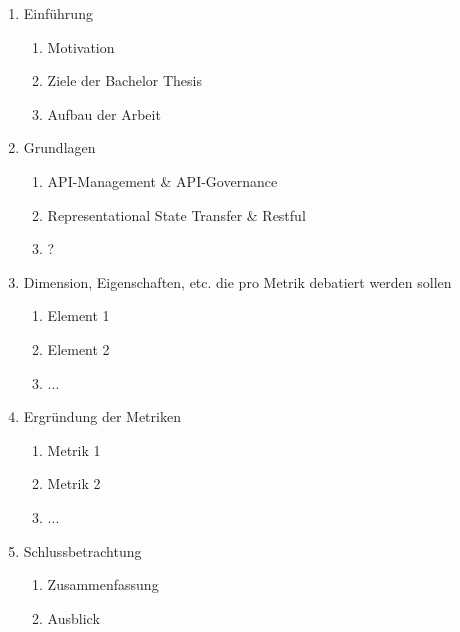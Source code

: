 \documentclass[../../expose]{subfiles}
\begin{document}
\begin{enumerate}[1]
	\item Einführung
		\begin{enumerate}
			\item Motivation
			\item Ziele der Bachelor Thesis
			\item Aufbau der Arbeit
		\end{enumerate}
	\item Grundlagen
		\begin{enumerate}
   			\item API-Management \& API-Governance
   			\item Representational State Transfer \& Restful
   			\item ?
   		\end{enumerate}
	\item Dimension, Eigenschaften, etc. die pro Metrik debatiert werden sollen
    	\begin{enumerate}
			\item Element 1
			\item Element 2
			\item ...
		\end{enumerate}
	\item Ergründung der Metriken
    	\begin{enumerate}
			\item Metrik 1
			\item Metrik 2
			\item ...
		\end{enumerate}
	\item Schlussbetrachtung
    	\begin{enumerate}
			\item Zusammenfassung
			\item Ausblick
		\end{enumerate}
\end{enumerate}
\end{document}
